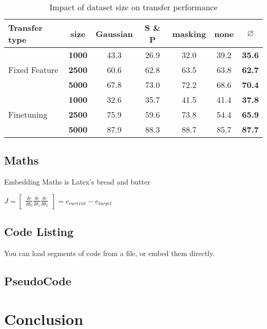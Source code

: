 \documentclass[10pt, a4paper]{article}
\begin{document}
    \begin{table*}[h]
    \centering
    \begin{tabular}{|l||c||c|c|c|c||c|}
    \hline
    Transfer type & size & Gaussian & S \& P & masking & none & $\varnothing$  \\
    \hline\hline
    \multirow{3}{6em}{Fixed Feature} & \textbf{1000} & 43.3 & 26.9 & 32.0 & 39.2 & \textbf{35.6} \\
    & \textbf{2500} & 60.6 & 62.8 & 63.5 & 63.8 & \textbf{62.7} \\
    & \textbf{5000} & 67.8 & 73.0 & 72.2 & 68.6 & \textbf{70.4} \\
    \hline
    \multirow{3}{6em}{Finetuning} & \textbf{1000} & 32.6 & 35.7 & 41.5 & 41.4 & \textbf{37.8} \\
    & \textbf{2500} & 75.9 & 59.6 & 73.8 & 54.4 & \textbf{65.9} \\
    & \textbf{5000} & 87.9 & 88.3 & 88.7 & 85.7 & \textbf{87.7} \\
    \hline
    \end{tabular}
    \caption{Impact of dataset size on transfer performance}
    \label{table:imfidasi}
    \end{table*}    
    
    
	\subsection{Maths}
    Embedding Maths is Latex's bread and butter    
    
    {\centering \Large \(
        J = \begin{bmatrix}
            \frac{\delta e}{\delta \theta _0}
            \frac{\delta e}{\delta \theta _1}
            \frac{\delta e}{\delta \theta _2}
        \end{bmatrix}
        = e_{current} - e_{target} 
    \)\par}
	
	\subsection{Code Listing}
    You can load segments of code from a file, or embed them directly.
    

    
\subsection{PseudoCode}


	
\section{Conclusion}	


		
\end{document}
